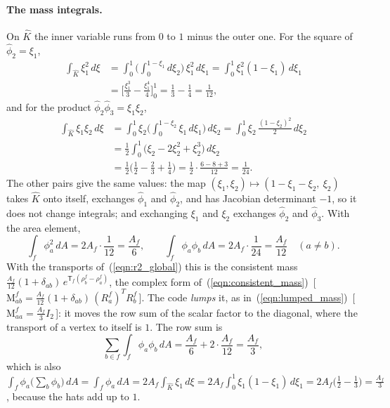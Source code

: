 \paragraph{The mass integrals.} On $\hat K$ the inner variable runs from $0$ to $1$ minus the outer one. For the square of $\hat\phi_2 = \xi_1$,
\begin{align*}
\int_{\hat K}\xi_1^2\, d\xi &= \int_0^1\Big(\int_0^{1 - \xi_1} d\xi_2\Big)\,\xi_1^2\, d\xi_1 = \int_0^1 \xi_1^2(1 - \xi_1)\, d\xi_1 \\
&= \Big[\frac{\xi_1^3}{3} - \frac{\xi_1^4}{4}\Big]_0^1 = \frac13 - \frac14 = \frac1{12} ,
\end{align*}
and for the product $\hat\phi_2\hat\phi_3 = \xi_1\xi_2$,
\begin{align*}
\int_{\hat K}\xi_1\xi_2\, d\xi &= \int_0^1\xi_2\Big(\int_0^{1 - \xi_2}\xi_1\, d\xi_1\Big)\, d\xi_2 = \int_0^1\xi_2\,\frac{(1 - \xi_2)^2}{2}\, d\xi_2 \\
&= \frac12\int_0^1\big(\xi_2 - 2\xi_2^2 + \xi_2^3\big)\, d\xi_2 \\
&= \frac12\Big(\frac12 - \frac23 + \frac14\Big) = \frac12\cdot\frac{6 - 8 + 3}{12} = \frac1{24} .
\end{align*}
The other pairs give the same values: the map $(\xi_1, \xi_2)\mapsto(1 - \xi_1 - \xi_2,\ \xi_2)$ takes $\hat K$ onto itself, exchanges $\hat\phi_1$ and $\hat\phi_2$, and has Jacobian determinant $-1$, so it does not change integrals; and exchanging $\xi_1$ and $\xi_2$ exchanges $\hat\phi_2$ and $\hat\phi_3$. With the area element,
\begin{equation*}
\int_f\phi_a^2\, dA = 2A_f\cdot\frac1{12} = \frac{A_f}{6}, \qquad \int_f\phi_a\phi_b\, dA = 2A_f\cdot\frac1{24} = \frac{A_f}{12}\quad (a \ne b) .
\end{equation*}
With the transports of~(\ref{eqn:r2_global}) this is the consistent mass $\frac{A_f}{12}(1 + \delta_{ab})\, e^{\mathsf T_f(\rho_b^f - \rho_a^f)}$, the complex form of~(\ref{eqn:consistent_mass})~[\,$\mathrm M^f_{ab} = \frac{A_f}{12}(1 + \delta_{ab})\,(R_a^f)^TR_b^f$\,]. The code \emph{lumps} it, as in~(\ref{eqn:lumped_mass})~[\,$\mathrm M^f_{aa} = \tfrac{A_f}3 I_2$\,]: it moves the row sum of the scalar factor to the diagonal, where the transport of a vertex to itself is $1$. The row sum is
\begin{equation*}
\sum_{b\in f}\int_f\phi_a\phi_b\, dA = \frac{A_f}{6} + 2\cdot\frac{A_f}{12} = \frac{A_f}{3} ,
\end{equation*}
which is also $\int_f\phi_a\big(\sum_b\phi_b\big)\, dA = \int_f\phi_a\, dA = 2A_f\int_{\hat K}\xi_1\, d\xi = 2A_f\int_0^1\xi_1(1 - \xi_1)\, d\xi_1 = 2A_f\big(\frac12 - \frac13\big) = \frac{A_f}{3}$, because the hats add up to $1$.

